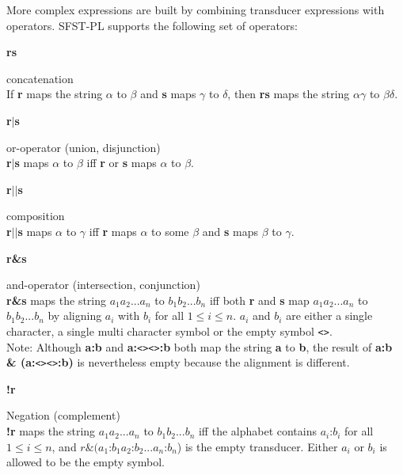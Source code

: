 \documentclass{article}
\begin{document}
More complex expressions are built by combining transducer expressions
with operators. SFST-PL supports the following set of operators:\\

\parbox[t]{1cm}{\textbf{rs}}
\begin{minipage}[t]{13cm}
  concatenation\\  
  If \textbf{r} maps the string $\alpha$ to $\beta$ and \textbf{s}
  maps $\gamma$ to $\delta$, then \textbf{rs} maps the string
  $\alpha\gamma$ to $\beta\delta$.\\
\end{minipage}
  
\parbox[t]{1cm}{\textbf{r$|$s}}
\begin{minipage}[t]{13cm}
  or-operator (union, disjunction) \\
  \textbf{r$|$s} maps $\alpha$ to $\beta$ iff \textbf{r} or
  \textbf{s} maps $\alpha$ to $\beta$.\\
\end{minipage}
  
\parbox[t]{1cm}{\textbf{r$||$s}}
\begin{minipage}[t]{13cm} 
  composition\\
  \textbf{r$||$s} maps $\alpha$ to $\gamma$ iff \textbf{r} maps $\alpha$
  to some $\beta$ and \textbf{s} maps $\beta$ to $\gamma$.\\
\end{minipage}
  
\parbox[t]{1cm}{\textbf{r\&s}}
\begin{minipage}[t]{13cm}
  and-operator (intersection, conjunction)\\
  \textbf{r\&s} maps the string $a_1a_2...a_n$ to $b_1b_2...b_n$ iff
  both \textbf{r} and \textbf{s} map $a_1a_2...a_n$ to $b_1b_2...b_n$
  by aligning $a_i$ with $b_i$ for all $1\le i \le n$. $a_i$ and $b_i$
  are either a single character, a single multi character symbol
  or the empty symbol \verb#<>#.\\
  Note: Although \textbf{a:b} and \textbf{a:}\verb#<><>#\textbf{:b}
  both map the string \textbf{a} to \textbf{b}, the result of
  \textbf{a:b \& (a:}\verb#<>#\verb#<>#\textbf{:b)} is
  nevertheless empty because the alignment is different.\\
\end{minipage}
  
\parbox[t]{1cm}{\textbf{!r}}
\begin{minipage}[t]{13cm}
  Negation (complement)\\
  \textbf{!r} maps the string $a_1a_2...a_n$ to $b_1b_2...b_n$ iff the
  alphabet contains $a_i$:$b_i$ for all $1\le i\le n$, and $r \&
  (a_1$:$b_1a_2$:$b_2...a_n$:$b_n$) is the empty transducer.  Either
  $a_i$ or $b_i$ is allowed to be the empty symbol.\\
\end{minipage}
\end{document}
